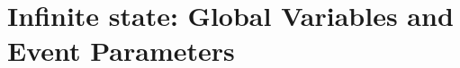 \documentclass[12pt]{article}
\begin{document}
%
%
%
%
%







\section{Infinite state: Global Variables and Event Parameters} \label{globalvars}
\end{document}
